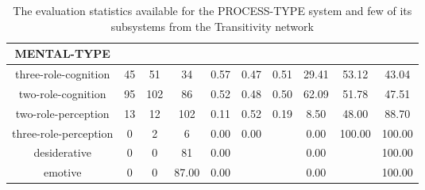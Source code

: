 \begin{table}[!ht]
{\begin{tabular}{|c|c|c|c|c|c|c|c|c|c|}
        MENTAL-TYPE &  &  &  &  &  &  &  &  &  \\ \hline
        three-role-cognition & 45 & 51 & 34 & 0.57 & 0.47 & 0.51 & 29.41 & 53.12 & 43.04 \\ \hline
        two-role-cognition & 95 & 102 & 86 & 0.52 & 0.48 & 0.50 & 62.09 & 51.78 & 47.51 \\ \hline
        two-role-perception & 13 & 12 & 102 & 0.11 & 0.52 & 0.19 & 8.50 & 48.00 & 88.70 \\ \hline
        three-role-perception & 0 & 2 & 6 & 0.00 & 0.00 &  & 0.00 & 100.00 & 100.00 \\ \hline
        desiderative & 0 & 0 & 81 & 0.00 &  &  & 0.00 &  & 100.00 \\ \hline
        emotive & 0 & 0 & 87.00 & 0.00 &  &  & 0.00 &  & 100.00 \\ \hline
    \end{tabular}
    }
    \caption{The evaluation statistics available for the PROCESS-TYPE system and few of its subsystems from the Transitivity network}
    \label{tab:features-transitivity-evaluation}
\end{table}

